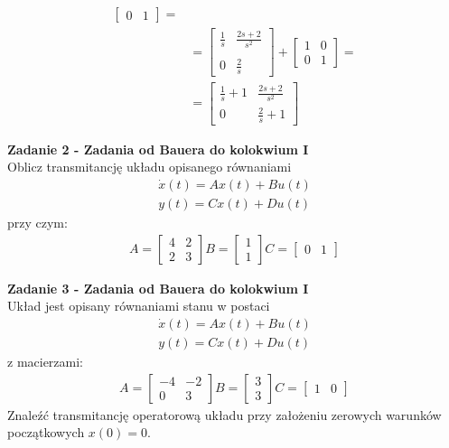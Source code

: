 \documentclass[a4paper,11pt]{article}
\begin{document}
\begin{align*}
\begin{bmatrix}
0 & 1
\end{bmatrix} =
\\
& =
\begin{bmatrix}
\frac{1}{s} & \frac{2s+2}{s^{2}} \\ \\
0 & \frac{2}{s}
\end{bmatrix}
+
\begin{bmatrix}
1 & 0 \\
0 & 1
\end{bmatrix} =
\\
& =
\begin{bmatrix}
\frac{1}{s}+1 & \frac{2s+2}{s^{2}} \\
0 & \frac{2}{s}+1
\end{bmatrix}
\end{align*}

\newpage
\begin{framed}
\textbf{Zadanie 2 - Zadania od Bauera do kolokwium I } \\ 
Oblicz transmitancję układu opisanego równaniami
\begin{align*}
\dot{x}(t)=Ax(t)+Bu(t) \\
y(t)=Cx(t)+Du(t)
\end{align*}
przy czym: \\
\begin{align*}
A = 
\begin{bmatrix}
4 & 2 \\
2 & 3
\end{bmatrix}
B = 
\begin{bmatrix}
1  \\
1
\end{bmatrix}
C = 
\begin{bmatrix}
0 & 1
\end{bmatrix}
\end{align*}

\end{framed}

\newpage
\begin{framed}
\textbf{Zadanie 3 - Zadania od Bauera do kolokwium I } \\ 
Układ jest opisany równaniami stanu w postaci
\begin{align*}
\dot{x}(t)=Ax(t)+Bu(t) \\
y(t)=Cx(t)+Du(t)
\end{align*}
z macierzami: \\
\begin{align*}
A = 
\begin{bmatrix}
-4 & -2 \\
0 & 3
\end{bmatrix}
B = 
\begin{bmatrix}
3  \\
3
\end{bmatrix}
C = 
\begin{bmatrix}
1 & 0
\end{bmatrix}
\end{align*}
Znaleźć transmitancję operatorową układu przy założeniu zerowych warunków początkowych \( x(0) = 0 \). 
\end{framed}
\end{document}

